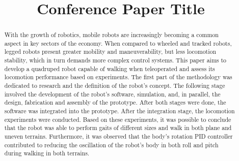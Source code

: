 \documentclass[conference]{IEEEtran}
\begin{document}
\title{Conference Paper Title\\
}

\author{
  \and
  \and
}

\maketitle

\begin{abstract}
  With the growth of robotics, mobile robots are increasingly becoming a common aspect in key sectors of the economy. When compared to wheeled and tracked robots, legged robots present greater mobility and maneuverability, but less locomotion stability, which in turn demands more complex control systems. This paper aims to develop a quadruped robot capable of walking when teleoperated and assess its locomotion performance based on experiments. The first part of the methodology was dedicated to research and the definition of the robot's concept. The following stage involved the development of the robot's software, simulation, and, in parallel, the design, fabrication and assembly of the prototype. After both stages were done, the software was integrated into the prototype. After the integration stage, the locomotion experiments were conducted. Based on these experiments, it was possible to conclude that the robot was able to perform gaits of different sizes and walk in both plane and uneven terrains. Furthermore, it was observed that the body's rotation PID controller contributed to reducing the oscillation of the robot's body in both roll and pitch during walking in both terrains.
\end{abstract}
\end{document}
